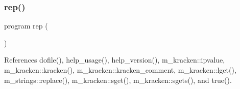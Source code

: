\subsubsection{\texorpdfstring{rep()}{rep()}}
{\footnotesize\ttfamily program rep (\begin{DoxyParamCaption}{ }\end{DoxyParamCaption})}



References dofile(), help\+\_\+usage(), help\+\_\+version(), m\+\_\+kracken\+::ipvalue, m\+\_\+kracken\+::kracken(), m\+\_\+kracken\+::kracken\+\_\+comment, m\+\_\+kracken\+::lget(), m\+\_\+strings\+::replace(), m\+\_\+kracken\+::sget(), m\+\_\+kracken\+::sgets(), and true().

